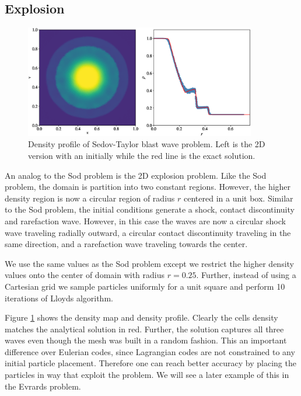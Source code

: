 \subsection{Explosion}
\begin{figure}
    \begin{center}
        \includegraphics[width=0.9\textwidth]{figures/explosion_2d.eps}
        \caption{Density profile of Sedov-Taylor blast wave problem. Left is the 2D version with an initially
        while the red line is the exact solution.}
        \label{fig.explosion_2d}
    \end{center}
\end{figure}
An analog to the Sod problem is the 2D explosion problem. Like the Sod problem, the domain
is partition into two constant regions. However, the higher density region is now a circular
region of radius $r$ centered in a unit box. Similar to the Sod problem, the initial 
conditions generate a shock, contact discontinuity and rarefaction wave. However, in this case
the waves are now a circular shock wave traveling radially outward, a circular contact
discontinuity traveling in the same direction, and a rarefaction wave traveling towards the
center.

We use the same values as the Sod problem except we restrict the higher density values onto
the center of domain with radius $r=0.25$. Further, instead of using a Cartesian grid we sample
particles uniformly for a unit square and perform 10 iterations of Lloyds algorithm. 

Figure \ref{fig.explosion_2d} shows the density map and density profile. Clearly the cells
density matches the analytical solution in red. Further, the solution captures all three waves
even though the mesh was built in a random fashion. This an important difference over Eulerian
codes, since Lagrangian codes are not constrained to any initial particle placement. Therefore
one can reach better accuracy by placing the particles in way that exploit the problem. We will
see a later example of this in the Evrards problem.

